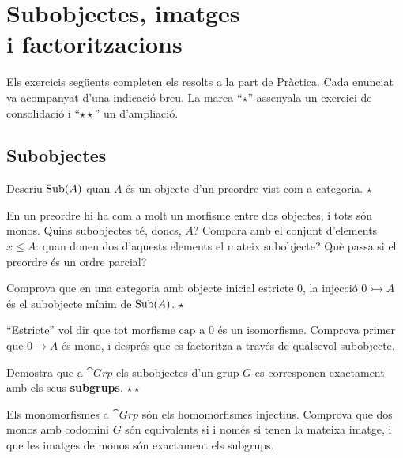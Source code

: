 \chapter[Subobjectes, imatges i factoritzacions]{\texorpdfstring{Subobjectes, imatges\\ i factoritzacions}{Subobjectes, imatges i factoritzacions}}

Els exercicis següents completen els resolts a la part de Pràctica. Cada enunciat va acompanyat d'una indicació breu. La marca \enquote{$\star$} assenyala un exercici de consolidació i \enquote{$\star\star$} un d'ampliació.

\section{Subobjectes}

\begin{exercici}
Descriu $\operatorname{Sub}(A)$ quan $A$ és un objecte d'un preordre vist com a categoria. \hfill{\normalfont$\star$}
\begin{indicacio}
En un preordre hi ha com a molt un morfisme entre dos objectes, i tots són monos. Quins subobjectes té, doncs, $A$? Compara amb el conjunt d'elements $x\leq A$: quan donen dos d'aquests elements el mateix subobjecte? Què passa si el preordre és un ordre parcial?
\end{indicacio}
\end{exercici}

\begin{exercici}
Comprova que en una categoria amb objecte inicial estricte $0$, la injecció $0\rightarrowtail A$ és el subobjecte mínim de $\operatorname{Sub}(A)$. \hfill{\normalfont$\star$}
\begin{indicacio}
\enquote{Estricte} vol dir que tot morfisme cap a $0$ és un isomorfisme. Comprova primer que $0\to A$ és mono, i després que es factoritza a través de qualsevol subobjecte.
\end{indicacio}
\end{exercici}

\begin{exercici}
Demostra que a $\cat{Grp}$ els subobjectes d'un grup $G$ es corresponen exactament amb els seus \textbf{subgrups}. \hfill{\normalfont$\star\star$}
\begin{indicacio}
Els monomorfismes a $\cat{Grp}$ són els homomorfismes injectius. Comprova que dos monos amb codomini $G$ són equivalents si i només si tenen la mateixa imatge, i que les imatges de monos són exactament els subgrups.
\end{indicacio}
\end{exercici}

